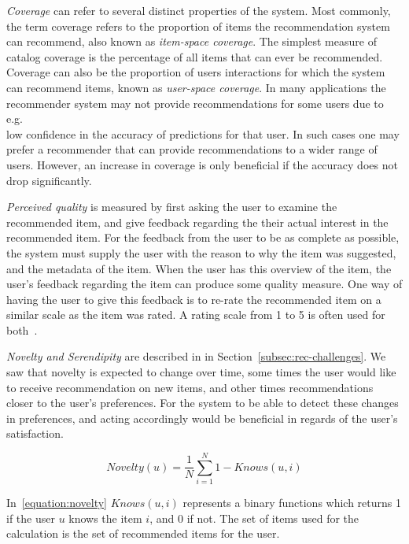 \textit{Coverage} can refer to several distinct properties of the system. Most
commonly, the term coverage refers to the proportion of items the
recommendation system can recommend, also known as \emph{item-space coverage}.
The simplest measure of catalog coverage is the percentage of all items that
can ever be recommended. Coverage can also be the proportion of users
interactions for which the system can recommend items, known as
\emph{user-space coverage}. In many applications the recommender system may not
provide recommendations for some users due to e.g.\\ low confidence in the
accuracy of predictions for that user. In such cases one may prefer a
recommender that can provide recommendations to a wider range of users.
However, an increase in coverage is only beneficial if the accuracy does not
drop significantly.

\textit{Perceived quality} is measured by first asking the user to examine the
recommended item, and give feedback regarding the their actual interest in the
recommended item.  For the feedback from the user to be as complete as
possible, the system must supply the user with the reason to why the item was
suggested, and the metadata of the item.  When the user has this overview of
the item, the user's feedback regarding the item can produce some quality
measure.  One  way of having the user to give this feedback is to re-rate the
recommended item on a similar scale as the item was rated.  A rating scale from
1 to 5 is often used for both~\cite{Schafer:1999:RSE:336992.337035}.

\textit{Novelty and Serendipity} are described in in
Section~\ref{subsec:rec-challenges}. We saw that novelty is expected to change
over time, some times the user would like to receive recommendation on new
items, and other times recommendations closer to the user's preferences.  For
the system to be able to detect these changes in preferences, and acting
accordingly would be beneficial in regards of the user's satisfaction.

\begin{equation}
    Novelty(u) = \frac{1}{N}\sum_{i=1}^{N}{1 - Knows(u,i)}
    \label{equation:novelty}
\end{equation}

In~\ref{equation:novelty} $Knows(u,i)$ represents a binary functions which
returns 1 if the user $u$ knows the item $i$, and 0 if not.  The set of items
used for the calculation is the set of recommended items for the user.

